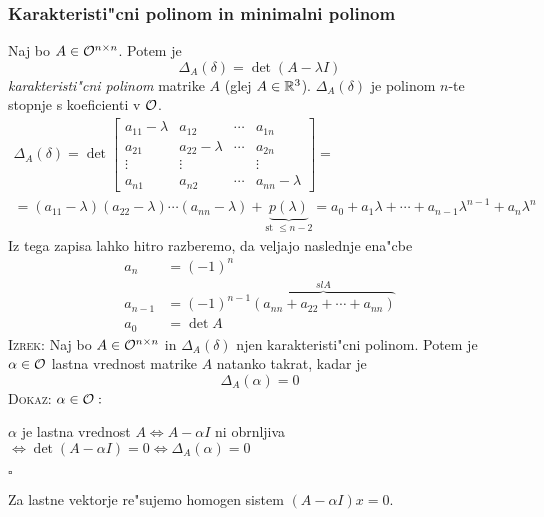 \subsubsection{Karakteristi"cni polinom in minimalni polinom}
Naj bo $A \in \mathcal{O}^{n \times n}$. Potem je
\begin{equation*}
\Delta_A(\delta) = \det (A - \lambda I)
\end{equation*}
\emph{karakteristi"cni polinom} matrike $A$ (glej $A \in \mathbb{R}^3$). $\Delta_A(\delta)$ je polinom $n$-te stopnje s koeficienti v $\mathcal{O}$.
\begin{gather*}
\Delta_A(\delta) = \det \begin{bmatrix}
a_{11} - \lambda & a_{12} & \cdots & a_{1n} \\
a_{21} & a_{22} - \lambda & \cdots & a_{2n} \\
\vdots & \vdots & & \vdots \\
a_{n1} & a_{n2} & \cdots & a_{nn} - \lambda
\end{bmatrix} = \\
= (a_{11} - \lambda) (a_{22} - \lambda) \cdots (a_{nn} - \lambda) + \underbrace{p(\lambda)}_\text{st $\leq n-2$} = a_0 + a_1 \lambda + \cdots + a_{n-1} \lambda^{n-1} + a_n \lambda^n
\end{gather*}
Iz tega zapisa lahko hitro razberemo, da veljajo naslednje ena"cbe
\begin{align*}
a_n &= (-1)^n \\
a_{n-1} &= (-1)^{n-1} \overbrace{(a_{nn} + a_{22} + \cdots + a_{nn})}^{sl A} \\
a_0 &= \det A
\end{align*}
\textsc{Izrek:} Naj bo $A \in \mathcal{O}^{n \times n}$ in $\Delta_A(\delta)$ njen karakteristi"cni polinom. Potem je $\alpha \in \mathcal{O}$ lastna vrednost matrike $A$ natanko takrat, kadar je
\begin{equation*}
\Delta_A(\alpha) = 0
\end{equation*}
\textsc{Dokaz:} $\alpha \in \mathcal{O}:$

$\alpha$ je lastna vrednost $A \iff A- \alpha I$ ni obrnljiva $\iff \det (A - \alpha I) = 0 \iff \Delta_A(\alpha) = 0$

\hfill $\square$

Za lastne vektorje re"sujemo homogen sistem $(A - \alpha I)x = 0$.


